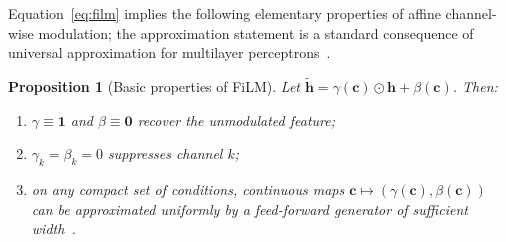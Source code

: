 \documentclass[final,3p,times]{elsarticle}
\newtheorem{proposition}{Proposition}
\begin{document}
Equation~\eqref{eq:film} implies the following elementary properties of affine channel-wise modulation; the approximation statement is a standard consequence of universal approximation for multilayer perceptrons~\cite{hornik1989mlp}.

\begin{proposition}[Basic properties of FiLM]
\label{prop:film}
Let $\tilde{\mathbf{h}}=\gamma(\mathbf{c})\odot\mathbf{h}+\beta(\mathbf{c})$. Then:
\begin{enumerate}
\item[(i)] $\gamma\equiv\mathbf{1}$ and $\beta\equiv\mathbf{0}$ recover the unmodulated feature;
\item[(ii)] $\gamma_{k}=\beta_{k}=0$ suppresses channel $k$;
\item[(iii)] on any compact set of conditions, continuous maps $\mathbf{c}\mapsto(\gamma(\mathbf{c}),\beta(\mathbf{c}))$ can be approximated uniformly by a feed-forward generator of sufficient width~\cite{hornik1989mlp}.
\end{enumerate}
\end{proposition}
\end{document}
